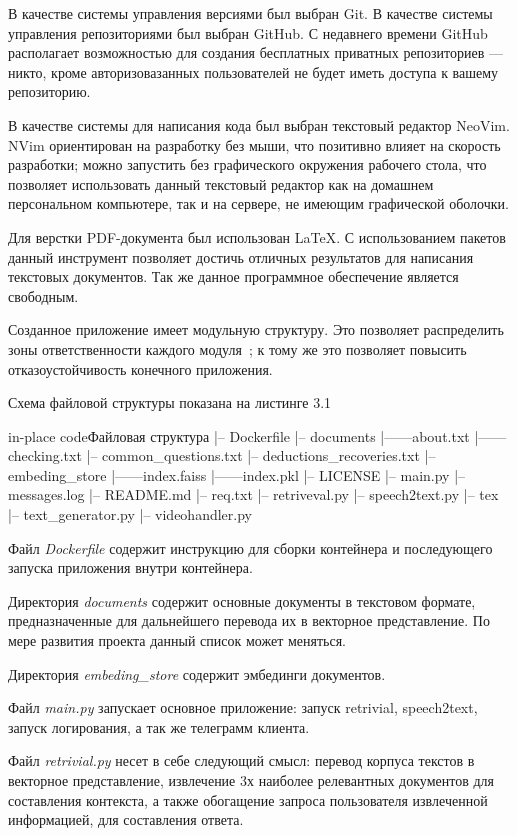 В качестве системы управления версиями был выбран Git. В качестве системы 
управления репозиториями был выбран GitHub. С недавнего времени GitHub 
располагает возможностью для создания бесплатных приватных репозиториев ---
никто, кроме авторизовазанных пользователей не будет иметь доступа к вашему
репозиторию.

В качестве системы для написания кода был выбран текстовый редактор NeoVim.
NVim ориентирован на разработку без мыши, что позитивно влияет на скорость 
разработки; можно запустить без графического окружения рабочего стола, что
позволяет использовать данный текстовый редактор как на домашнем персональном
компьютере, так и на сервере, не имеющим графической оболочки.

Для верстки PDF-документа был использован \LaTeX. С использованием пакетов
данный инструмент позволяет достичь отличных результатов для написания
текстовых документов. Так же данное программное обеспечение является свободным.

Созданное приложение имеет модульную структуру. Это позволяет распределить
зоны ответственности каждого модуля~\cite{solid}; к тому же это позволяет повысить 
отказоустойчивость конечного приложения. 

Схема файловой структуры показана на листинге 3.1

\begin{codepiece}{in-place code}{Файловая структура}
|-- Dockerfile
|-- documents
|------about.txt
|------checking.txt
|--  common_questions.txt
|--  deductions_recoveries.txt
|-- embeding_store
|------index.faiss
|------index.pkl
|-- LICENSE
|-- main.py
|-- messages.log
|-- README.md
|-- req.txt
|-- retriveval.py
|-- speech2text.py
|-- tex
|-- text_generator.py
|-- videohandler.py
\end{codepiece}

Файл \emph{Dockerfile} содержит инструкцию для сборки контейнера и последующего
запуска приложения внутри контейнера.

Директория \emph{documents} содержит основные документы в текстовом формате,
предназначенные для дальнейшего перевода их в векторное представление. По мере
развития проекта данный список может меняться.

Директория \emph{embeding\_store} содержит эмбединги документов.

Файл \emph{main.py} запускает основное приложение: запуск retrivial, speech2text,
запуск логирования, а так же телеграмм клиента.

Файл \emph{retrivial.py} несет в себе следующий смысл: перевод корпуса текстов
в векторное представление, извлечение 3х наиболее релевантных документов для
составления контекста, а также обогащение запроса пользователя извлеченной
информацией, для составления ответа.

